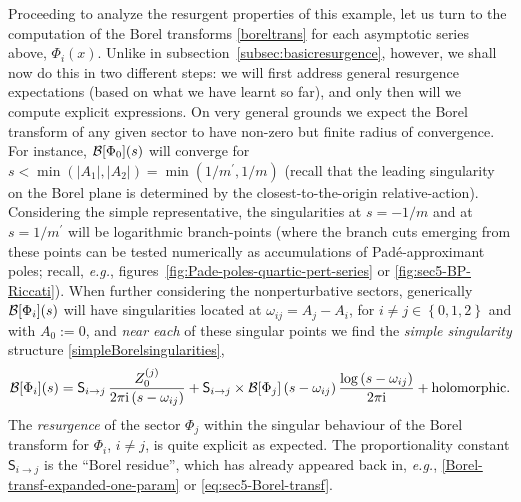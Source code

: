 \documentclass[11pt,a4paper]{article}
\newcommand{\CB}{{\cal B}}
\newcommand{\be}{\begin{equation}}
\newcommand{\ee}{\end{equation}}
\newcommand{\rmi}{{\mathrm{i}}}
\begin{document}
Proceeding to analyze the resurgent properties of this example, let us turn to the computation of the Borel transforms \eqref{boreltrans} for each asymptotic series above, $\Phi_{i}(x)$. Unlike in subsection~\ref{subsec:basicresurgence}, however, we shall now do this in two different steps: we will first address general resurgence expectations (based on what we have learnt so far), and only then will we compute explicit expressions. On very general grounds we expect the Borel transform of any given sector to have non-zero but finite radius of convergence. For instance, $\CB [\Phi_0] (s)$ will converge for $s < \min \left( |A_1|, |A_2| \right) = \min \left( 1/m^\prime, 1/m \right)$ (recall that the leading singularity on the Borel plane is determined by the closest-to-the-origin relative-action). Considering the simple representative, the singularities at $s=-1/m$ and at $s=1/m^\prime$ will be logarithmic branch-points (where the branch cuts emerging from these points can be tested numerically as accumulations of Pad\'e-approximant poles; recall, \textit{e.g.}, figures~\ref{fig:Pade-poles-quartic-pert-series} or \ref{fig:sec5-BP-Riccati}). When further considering the nonperturbative sectors, generically $\CB [\Phi_i] (s)$ will have singularities located at $\omega_{ij} = A_j-A_i$, for $i \ne j \in \left\{ 0, 1, 2 \right\}$ and with $A_0:=0$, and \textit{near each} of these singular points we find the \textit{simple singularity} structure \eqref{simpleBorelsingularities},
%
\be
\label{ellipticBPhiiSij}
\CB [\Phi_i] (s) = \mathsf{S}_{i\to j}\, \frac{Z^{(j)}_0}{2\pi\rmi \left( s-\omega_{ij} \right)} + \mathsf{S}_{i\to j} \times \CB [\Phi_j] \left(s-\omega_{ij}\right) \frac{\log \left(s-\omega_{ij}\right)}{2\pi\rmi} + \text{holomorphic}.
\ee
%
\noindent
The \textit{resurgence} of the sector $\Phi_j$ within the singular behaviour of the Borel transform for $\Phi_i$, $i\ne j$, is quite explicit as expected. The proportionality constant $\mathsf{S}_{i\to j}$ is the ``Borel residue'', which has already appeared back in, \textit{e.g.}, \eqref{Borel-transf-expanded-one-param} or \eqref{eq:sec5-Borel-transf}.
\end{document}
